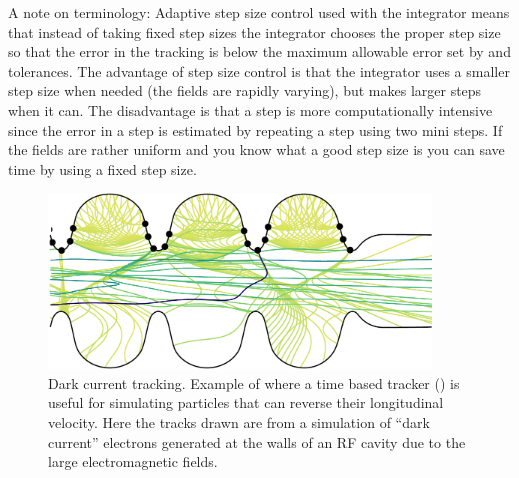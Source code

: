 A note on terminology: Adaptive step size control used with the
 integrator means that instead of taking fixed step
sizes the integrator chooses the proper step size so that the error in
the tracking is below the maximum allowable error set by 
and  tolerances. The advantage of step size control is
that the integrator uses a smaller step size when needed (the fields
are rapidly varying), but makes larger steps when it can. The
disadvantage is that a step is more computationally intensive since
the error in a step is estimated by repeating a step using two mini
steps. If the fields are rather uniform and you know what a good step
size is you can save time by using a fixed step size.

\begin{figure}[tb]
  \centering
  \includegraphics[width=4in]{dark-current.pdf}
  \caption[Dark current tracking.]{
Dark current tracking. Example of where a time based tracker () is
useful for simulating particles that can reverse their longitudinal velocity. Here the
tracks drawn are from a simulation of ``dark current'' electrons generated at the
walls of an RF cavity due to the large electromagnetic fields.
}
  \label{f:dark.current}
\end{figure}

